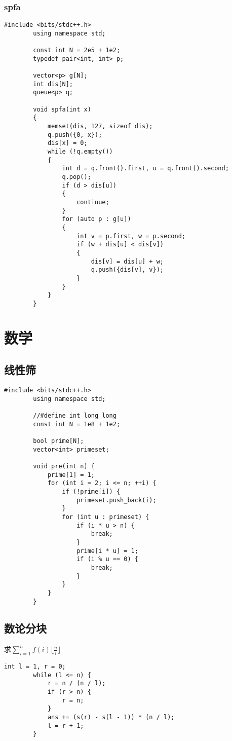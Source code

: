 \documentclass[12pt, a4paper]{ctexart}
\begin{document}
	\subsubsection{spfa}
	\begin{lstlisting}[caption={}]
		#include <bits/stdc++.h>
		using namespace std;
		
		const int N = 2e5 + 1e2;
		typedef pair<int, int> p;
		
		vector<p> g[N];
		int dis[N];
		queue<p> q;
		
		void spfa(int x)
		{
			memset(dis, 127, sizeof dis);
			q.push({0, x});
			dis[x] = 0;
			while (!q.empty())
			{
				int d = q.front().first, u = q.front().second;
				q.pop();
				if (d > dis[u])
				{
					continue;
				}
				for (auto p : g[u])
				{
					int v = p.first, w = p.second;
					if (w + dis[u] < dis[v])
					{
						dis[v] = dis[u] + w;
						q.push({dis[v], v});
					}
				}
			}
		}
	\end{lstlisting}
	
	\newpage
	\section{数学}
	\subsection{线性筛}
	\begin{lstlisting}[caption={}]
		#include <bits/stdc++.h>
		using namespace std;
		
		//#define int long long
		const int N = 1e8 + 1e2;
		
		bool prime[N];
		vector<int> primeset;
		
		void pre(int n) {
			prime[1] = 1;
			for (int i = 2; i <= n; ++i) {
				if (!prime[i]) {
					primeset.push_back(i);
				}
				for (int u : primeset) {
					if (i * u > n) {
						break;
					}
					prime[i * u] = 1;
					if (i % u == 0) {
						break;
					}
				}
			}
		}
	\end{lstlisting}
	\subsection{数论分块}
	求$\sum_{i = 1}^{n}f(i)\lfloor \frac{n}{i} \rfloor$
	\begin{lstlisting}[caption={}]
		int l = 1, r = 0;
		while (l <= n) {
			r = n / (n / l);
			if (r > n) {
				r = n;
			}
			ans += (s(r) - s(l - 1)) * (n / l);
			l = r + 1;
		}
	\end{lstlisting}
\end{document}
